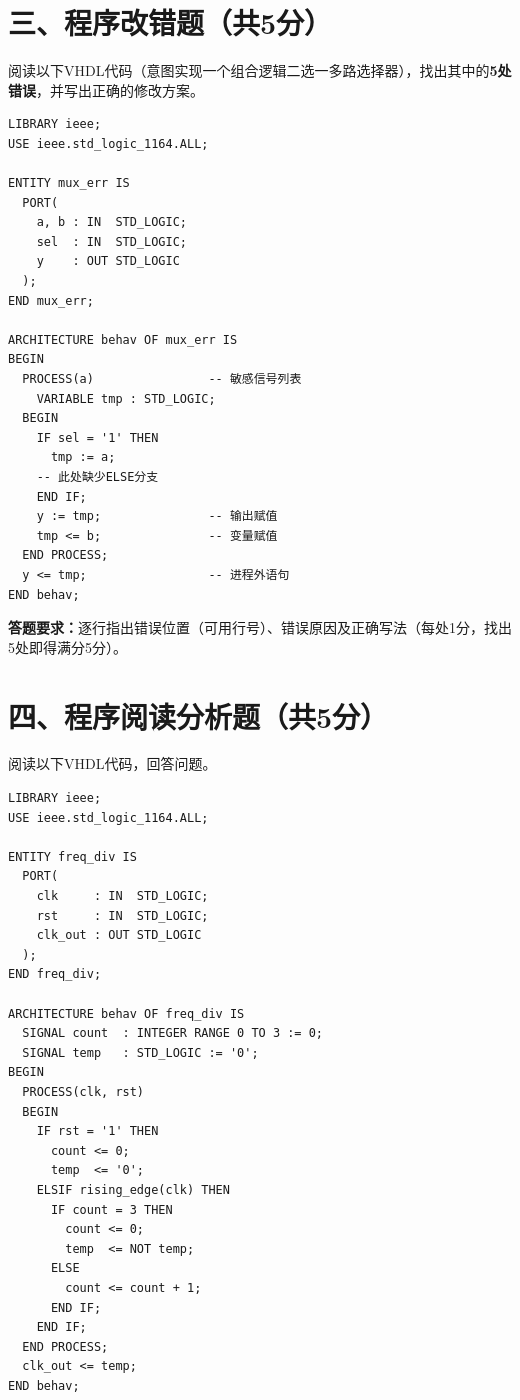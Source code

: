 \newpage

\section*{三、程序改错题（共5分）}

阅读以下VHDL代码（意图实现一个组合逻辑二选一多路选择器），找出其中的\textbf{5处错误}，并写出正确的修改方案。

\begin{lstlisting}[caption={存在5处错误的VHDL代码}]
LIBRARY ieee;
USE ieee.std_logic_1164.ALL;

ENTITY mux_err IS
  PORT(
    a, b : IN  STD_LOGIC;
    sel  : IN  STD_LOGIC;
    y    : OUT STD_LOGIC
  );
END mux_err;

ARCHITECTURE behav OF mux_err IS
BEGIN
  PROCESS(a)                -- 敏感信号列表
    VARIABLE tmp : STD_LOGIC;
  BEGIN
    IF sel = '1' THEN
      tmp := a;
    -- 此处缺少ELSE分支
    END IF;
    y := tmp;               -- 输出赋值
    tmp <= b;               -- 变量赋值
  END PROCESS;
  y <= tmp;                 -- 进程外语句
END behav;
\end{lstlisting}

\begin{framed}
\textbf{答题要求：}逐行指出错误位置（可用行号）、错误原因及正确写法（每处1分，找出5处即得满分5分）。
\end{framed}

\newpage

\section*{四、程序阅读分析题（共5分）}

阅读以下VHDL代码，回答问题。

\begin{lstlisting}[caption={分析用VHDL代码——分频器}]
LIBRARY ieee;
USE ieee.std_logic_1164.ALL;

ENTITY freq_div IS
  PORT(
    clk     : IN  STD_LOGIC;
    rst     : IN  STD_LOGIC;
    clk_out : OUT STD_LOGIC
  );
END freq_div;

ARCHITECTURE behav OF freq_div IS
  SIGNAL count  : INTEGER RANGE 0 TO 3 := 0;
  SIGNAL temp   : STD_LOGIC := '0';
BEGIN
  PROCESS(clk, rst)
  BEGIN
    IF rst = '1' THEN
      count <= 0;
      temp  <= '0';
    ELSIF rising_edge(clk) THEN
      IF count = 3 THEN
        count <= 0;
        temp  <= NOT temp;
      ELSE
        count <= count + 1;
      END IF;
    END IF;
  END PROCESS;
  clk_out <= temp;
END behav;
\end{lstlisting}

